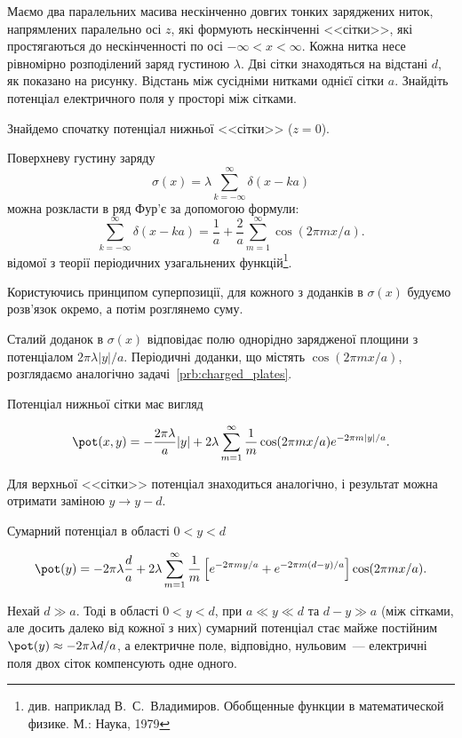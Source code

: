 \begin{problem}\label{prb:Faraday_cage}
Маємо два паралельних масива нескінченно довгих тонких заряджених ниток, напрямлених паралельно осі
$z$, які формують нескінченні <<сітки>>, які простягаються до нескінченності по осі $-\infty < x <
\infty$. Кожна нитка несе рівномірно розподілений заряд густиною $\lambda$. Дві сітки знаходяться на
відстані $d$, як показано на рисунку. Відстань між сусідніми нитками однієї сітки $a$. Знайдіть
потенціал електричного поля у просторі між сітками.
\begin{solution}
	Знайдемо спочатку потенціал нижньої <<сітки>> ($z = 0$).

Поверхневу густину заряду
\[
    \sigma(x) = \lambda\sum\limits_{k = -\infty}^{\infty} \delta(x - ka)
\]
можна розкласти в ряд Фур'є за допомогою формули:
	\[
		\sum\limits_{k = -\infty}^{\infty} \delta(x - ka) =  \frac{1}{a} + \frac{2}{a}\sum\limits_{m=1}^{\infty}\cos(2\pi mx/a).
	\]
відомої з теорії періодичних узагальнених функцій\footnote{див. наприклад В.~С.~Владимиров. Обобщенные функции в математической физике. М.: Наука, 1979}.

Користуючись принципом суперпозиції, для кожного з доданків в $\sigma(x)$  будуємо розв’язок окремо, а потім розглянемо суму.

Сталий доданок в $\sigma(x)$  відповідає полю однорідно зарядженої площини з потенціалом $2\pi\lambda|y|/a$. Періодичні доданки, що містять $\cos(2\pi mx/a)$, розглядаємо аналогічно задачі~\ref{prb:charged_plates}.

Потенціал нижньої сітки має вигляд


	\[
		\pot(x,y) = -\frac{2\pi\lambda}{a}|y| + 2\lambda\sum\limits_{m = 1}^{\infty} \frac1m \cos(2\pi mx/a)e^{-2\pi m|y|/a}.
	\]

	Для верхньої  <<сітки>> потенціал знаходиться аналогічно, і результат можна отримати заміною $y \to y - d$.

    Сумарний потенціал в області $0 < y <d$


	\[
		\pot(y) = -2\pi\lambda\frac{d}{a} + 2\lambda\sum\limits_{m = 1}^{\infty} \frac1m \left[ e^{-2\pi my/a} +  e^{-2\pi m (d - y)/a} \right] \cos(2\pi mx/a).
	\]

Нехай $d \gg a$. Тоді в області $0<y<d$, при $a \ll y \ll d$ та $d - y \gg a$ (між сітками, але досить
далеко від кожної з них) сумарний потенціал стає майже постійним $\pot(y) \approx  - 2\pi \lambda
d/a$, а електричне поле, відповідно, нульовим~--- електричні поля двох сіток компенсують одне одного.

\end{solution}
\end{problem}

